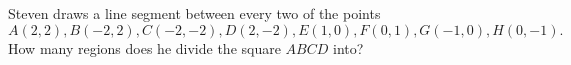 Steven draws a line segment between every two of the points \[A(2,2), B(-2,2), C(-2,-2), D(2,-2), E(1,0), F(0,1), G(-1,0), H(0,-1).\] How many regions does he divide the square $ABCD$ into?

